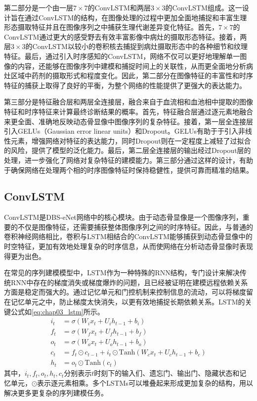 第二部分是一个由一层\(7 \times 7\)的ConvLSTM和两层\(3 \times 3\)的ConvLSTM组成。这一设计旨在通过ConvLSTM的结构，在图像处理的过程中更加全面地捕捉和丰富生理形态摄取特征并且在图像序列之中捕获生理代谢差异变化特征。首先，\(7 \times 7\)的ConvLSTM通过更大的感受野去有效丰富影像中病灶的摄取形态特征。接着，两层\(3 \times 3\)的ConvLSTM以较小的卷积核去捕捉到病灶摄取形态中的各种细节和纹理特征。最后，通过引入时序感知的ConvLSTM，网络不仅可以更好地理解单一图像的内容，还能够在图像序列中建模和捕捉时间上的关联性，从而更全面地分析病灶区域中药剂的摄取形式和程度变化。因此，第二部分在图像特征的丰富性和时序特征的捕获上取得了良好的平衡，为整个网络的性能提供了更强大的表达能力。

第三部分是特征融合层和两层全连接层，融合来自于血流相和血池相中提取的图像特征和时序特征来计算最终诊断结果的概率。首先，特征融合层通过逐元素地融合来更全面、准确地反映动态骨显像中图像序列的复杂特征。接着，第一层全连接层引入GELUs（Gaussian error linear units）和Dropout\cite{srivastava2014dropout}。GELUs有助于于引入非线性元素，增强网络对特征的表达能力，同时Dropout则在一定程度上减轻了过拟合的风险，提供了模型的泛化能力。最后，第二层全连接层的输出经过Dropout层的处理，进一步强化了网络对复杂特征的建模能力。第三部分通过这样的设计，有助于确保网络在处理两个相的时序图像特征时保持稳健性，提供可靠而精准的结果。

\subsection{ConvLSTM}

ConvLSTM是DBS-eNet网络中的核心模块。由于动态骨显像是一个图像序列，重要的不仅是图像特征，还需要捕获整体图像序列之间的时序特征。因此，与普通的卷积神经网络相比，卷积与LSTM相结合的ConvLSTM能够捕获到动态骨显像中的时空特征，更加有效地处理复杂的时序信息，从而使网络在分析动态骨显像时表现得更为出色。

在常见的序列建模模型中，LSTM\cite{memory2010long}作为一种特殊的RNN结构，专门设计来解决传统RNN中存在的梯度消失或梯度爆炸的问题，且已经被证明在建模远程依赖关系方面是稳定而强大的。通过记忆单元和门控机制来控制信息的流动，可以将梯度留在记忆单元之中，防止梯度太快消失，以更有效地捕捉长期依赖关系。LSTM的关键公式如\ref{eq:chap03_lstm}所示。
\begin{equation}
  \begin{aligned}
    i_t & = \sigma(W_i x_t + U_i h_{t-1} + b_i)                                    \\
    f_t & = \sigma(W_f x_t + U_f h_{t-1} + b_f)                                    \\
    o_t & = \sigma(W_o x_t + U_o h_{t-1} + b_o)                                    \\
    c_t & = f_t \odot c_{t-1} + i_t \odot \text{Tanh}(W_c x_t + U_c h_{t-1} + b_c) \\
    h_t & = o_t \odot \text{Tanh}(c_t)
  \end{aligned}
  \label{eq:chap03_lstm}
\end{equation}
其中，\(i_t,f_t,o_t,h_t,c_t\)分别表示\(t\)时刻下的输入们、遗忘门、输出门、隐藏状态和记忆单元，\(\odot\)表示逐元素相乘。多个LSTMs可以堆叠起来形成更加复杂的结构，用以解决更多更复杂的序列建模任务。

